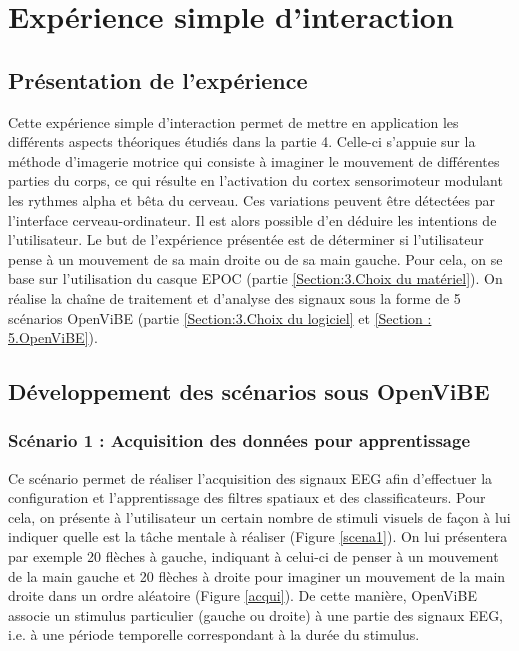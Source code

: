 \chapter{Expérience simple d'interaction}
\label{Chapitre : Première exprérience simple d'interaction}
\thispagestyle{fancy}

\section {Présentation de l'expérience}
\label{Section : 6.présentation de l'expérience}
Cette expérience simple d'interaction permet de mettre en application les différents aspects théoriques étudiés dans la partie 4. Celle-ci s'appuie sur la méthode d'imagerie motrice qui consiste à imaginer le mouvement de différentes parties du corps, ce qui résulte en l'activation du cortex sensorimoteur modulant les rythmes alpha et bêta du cerveau. Ces variations peuvent être détectées par l'interface cerveau-ordinateur. Il est alors possible d'en déduire les intentions de l'utilisateur.
Le but de l'expérience présentée est de déterminer si l'utilisateur pense à un mouvement de sa main droite ou de sa main gauche.
Pour cela, on se base sur l'utilisation du casque EPOC (partie \ref{Section:3.Choix du matériel}). On réalise la chaîne de traitement et d'analyse des signaux sous la forme de 5 scénarios OpenViBE (partie \ref{Section:3.Choix du logiciel} et \ref{Section : 5.OpenViBE}).





\section {Développement des scénarios sous OpenViBE}
\label{Section : 6.Développement des scénarios sous OpenViBE}



\subsection{Scénario 1 : Acquisition des données pour apprentissage}
\label{Subsection : 6.Scénario 1}

Ce scénario permet de réaliser l'acquisition des signaux EEG afin d'effectuer la configuration et l'apprentissage des filtres spatiaux et des classificateurs. Pour cela, on présente à l'utilisateur un certain nombre de stimuli visuels de façon à lui indiquer quelle est la tâche mentale à réaliser (Figure \ref{scena1}). On lui présentera par exemple 20 flèches à gauche, indiquant à celui-ci de penser à un mouvement de la main gauche et 20 flèches à droite pour imaginer un mouvement de la main droite dans un ordre aléatoire (Figure \ref{acqui}). De cette manière, OpenViBE associe un stimulus particulier (gauche ou droite) à une partie des signaux EEG, i.e. à une période temporelle correspondant à la durée du stimulus.

